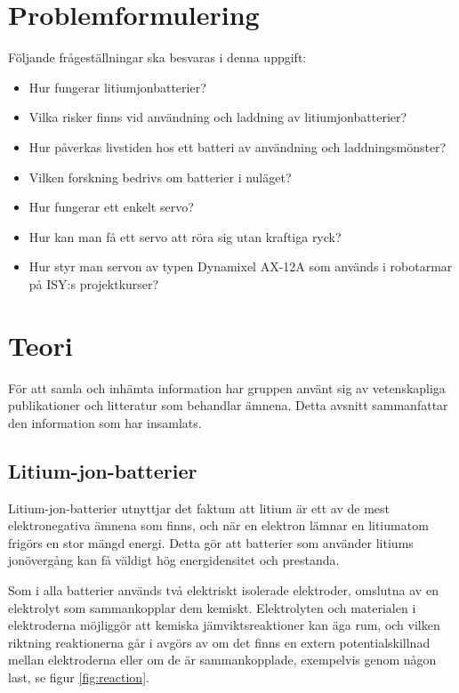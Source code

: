 \documentclass[a4paper,12pt]{article}
\begin{document}
\section{Problemformulering}
\label{sec:problem}
Följande frågeställningar ska besvaras i denna uppgift:
\begin{itemize}
\item Hur fungerar litiumjonbatterier?

\item Vilka risker finns vid användning och laddning av litiumjonbatterier?

\item Hur påverkas livstiden hos ett batteri av användning och laddningsmönster?

\item Vilken forskning bedrivs om batterier i nuläget?

\item Hur fungerar ett enkelt servo?

\item Hur kan man få ett servo att röra sig utan kraftiga ryck?

\item Hur styr man servon av typen Dynamixel AX-12A som används i robotarmar på ISY:s projektkurser?
\end{itemize}

\section{Teori}
För att samla och inhämta information har gruppen använt sig av vetenskapliga publikationer och litteratur som behandlar ämnena. Detta avsnitt sammanfattar den information som har insamlats.

\subsection{Litium-jon-batterier}
Litium-jon-batterier utnyttjar det faktum att litium är ett av de mest elektronegativa ämnena som finns, och när en elektron lämnar en litiumatom frigörs en stor mängd energi. Detta gör att batterier som använder litiums jonövergång kan få väldigt hög energidensitet och prestanda.

Som i alla batterier används två elektriskt isolerade elektroder, omslutna av en elektrolyt som sammankopplar dem kemiskt. Elektrolyten och materialen i elektroderna möjliggör att kemiska jämviktsreaktioner kan äga rum, och vilken riktning reaktionerna går i avgörs av om det finns en extern potentialskillnad mellan elektroderna eller om de är sammankopplade, exempelvis genom någon last, se figur \ref{fig:reaction}. \cite{glaize13}
\end{document}
